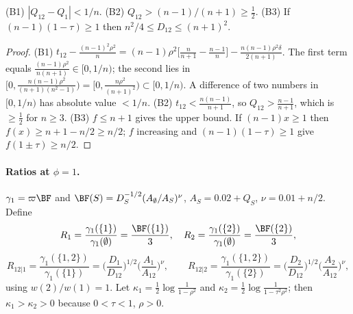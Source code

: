 \documentclass[11pt]{report}
\begin{document}
\begin{T09lemma}\label{T09:lem:bounds}
(B1) $|Q_{12}-Q_1|<1/n$. (B2) $Q_{12}>(n-1)/(n+1)\ge\tfrac12$. (B3) If $(n-1)(1-\tau)\ge1$ then $n^2/4\le D_{12}\le(n+1)^2$.
\end{T09lemma}
\begin{proof}
(B1) $t_{12}-\frac{(n-1)^2\rho^2}{n}=(n-1)\rho^2\big[\frac n{n+1}-\frac{n-1}n\big]-\frac{n(n-1)\rho^2\delta}{2(n+1)}$. The first term equals $\frac{(n-1)\rho^2}{n(n+1)}\in[0,1/n)$; the second lies in $[0,\frac{n(n-1)\rho^2}{(n+1)(n^2-1)})=[0,\frac{n\rho^2}{(n+1)^2})\subset[0,1/n)$. A difference of two numbers in $[0,1/n)$ has absolute value $<1/n$. (B2) $t_{12}<\frac{n(n-1)}{n+1}$, so $Q_{12}>\frac{n-1}{n+1}$, which is $\ge\frac12$ for $n\ge3$. (B3) $f\le n+1$ gives the upper bound. If $(n-1)x\ge1$ then $f(x)\ge n+1-n/2\ge n/2$; $f$ increasing and $(n-1)(1-\tau)\ge1$ give $f(1\pm\tau)\ge n/2$.
\end{proof}

\paragraph{Ratios at $\phi=1$.} $\gamma_1=\varpi\BF$ and $\BF(S)=D_S^{-1/2}(A_\emptyset/A_S)^\nu$, $A_S=0.02+Q_S$, $\nu=0.01+n/2$. Define
\[R_1=\frac{\gamma_1(\{1\})}{\gamma_1(\emptyset)}=\frac{\BF(\{1\})}3,\quad R_2=\frac{\gamma_1(\{2\})}{\gamma_1(\emptyset)}=\frac{\BF(\{2\})}3,\]
\[R_{12|1}=\frac{\gamma_1(\{1,2\})}{\gamma_1(\{1\})}=\Big(\frac{D_1}{D_{12}}\Big)^{1/2}\Big(\frac{A_1}{A_{12}}\Big)^\nu,\qquad R_{12|2}=\frac{\gamma_1(\{1,2\})}{\gamma_1(\{2\})}=\Big(\frac{D_2}{D_{12}}\Big)^{1/2}\Big(\frac{A_2}{A_{12}}\Big)^\nu,\]
using $w(2)/w(1)=1$. Let $\kappa_1=\tfrac12\log\frac1{1-\rho^2}$ and $\kappa_2=\tfrac12\log\frac1{1-\tau^2\rho^2}$; then $\kappa_1>\kappa_2>0$ because $0<\tau<1$, $\rho>0$.
\end{document}
